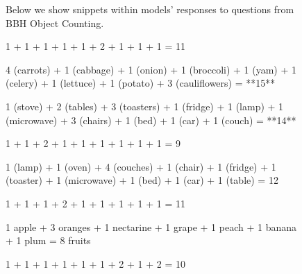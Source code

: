 \begin{figure}
    \centering
\begin{tcolorbox}[colback=gray!6, colframe=gray!50, arc=2mm, boxrule=0.5pt, title={\textit{BIG-bench Object Counting}}, coltitle=black, colbacktitle=gray!20]
    \small
    Below we show snippets within models' responses to questions from BBH Object Counting.

    \medskip

    \vspace{-0.1cm}
    \begin{tcolorbox}[custombox, title={GPT-4o mini}]
    1 + 1 + 1 + 1 + 1 + 2 + 1 + 1 + 1 = 11
    \end{tcolorbox}
    \begin{tcolorbox}[custombox, title={GPT-4o (Nov)}]
    4 (carrots) + 1 (cabbage) + 1 (onion) + 1 (broccoli) + 1 (yam) + 1 (celery) + 1 (lettuce) + 1 (potato) + 3 (cauliflowers) = **15**
    \end{tcolorbox}
    \begin{tcolorbox}[custombox, title={o1-preview}]
    1 (stove) + 2 (tables) + 3 (toasters) + 1 (fridge) + 1 (lamp) + 1 (microwave) + 3 (chairs) + 1 (bed) + 1 (car) + 1 (couch) = **14**
    \end{tcolorbox}
    \begin{tcolorbox}[custombox, title={Claude 3.5 Haiku}]
    1 + 1 + 2 + 1 + 1 + 1 + 1 + 1 + 1 = 9
    \end{tcolorbox}
    \begin{tcolorbox}[custombox, title={Llama 3.3 70B Instruct}]
    1 (lamp) + 1 (oven) + 4 (couches) + 1 (chair) + 1 (fridge) + 1 (toaster) + 1 (microwave) + 1 (bed) + 1 (car) + 1 (table) = 12
    \end{tcolorbox}
    \begin{tcolorbox}[custombox, title={Mistral Small}]
    1 + 1 + 1 + 2 + 1 + 1 + 1 + 1 + 1 = 11
    \end{tcolorbox}
    \begin{tcolorbox}[custombox, title={Gemini 1.5 Pro}]
    1 apple + 3 oranges + 1 nectarine + 1 grape + 1 peach + 1 banana + 1 plum = 8 fruits
    \end{tcolorbox}
    \begin{tcolorbox}[custombox, title={Gemini 2.0 Flash Thinking}]
    1 + 1 + 1 + 1 + 1 + 1 + 2 + 1 + 2 = 10
    \end{tcolorbox}

\end{tcolorbox}
\end{figure}
